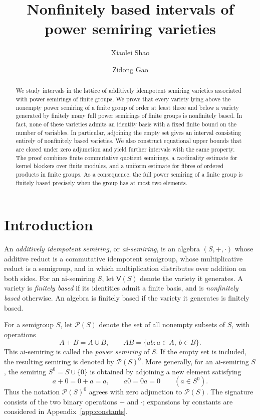 \documentclass[11pt,reqno]{amsart}
\title[Intervals of power semiring varieties]{Nonfinitely based intervals of power semiring varieties}
\author{Xiaolei Shao}
\author{Zidong Gao}
\date{}
\theoremstyle{definition}
\numberwithin{equation}{section}
\newcommand{\Pow}{\mathcal{P}}
\newcommand{\Full}[1]{\mathcal{P}(#1)^0}
\newcommand{\Var}{\mathsf{V}}
\begin{document}
\begin{abstract}
We study intervals in the lattice of additively idempotent semiring varieties associated with power semirings of finite groups. We prove that every variety lying above the nonempty power semiring of a finite group of order at least three and below a variety generated by finitely many full power semirings of finite groups is nonfinitely based. In fact, none of these varieties admits an identity basis with a fixed finite bound on the number of variables. In particular, adjoining the empty set gives an interval consisting entirely of nonfinitely based varieties. We also construct equational upper bounds that are closed under zero adjunction and yield further intervals with the same property. The proof combines finite commutative quotient semirings, a cardinality estimate for kernel blockers over finite modules, and a uniform estimate for fibres of ordered products in finite groups. As a consequence, the full power semiring of a finite group is finitely based precisely when the group has at most two elements.
\end{abstract}
\maketitle

\section{Introduction}
An \emph{additively idempotent semiring}, or \emph{ai-semiring}, is an algebra $(S,+,\cdot)$ whose additive reduct is a commutative idempotent semigroup, whose multiplicative reduct is a semigroup, and in which multiplication distributes over addition on both sides. For an ai-semiring $S$, let $\Var(S)$ denote the variety it generates. A variety is \emph{finitely based} if its identities admit a finite basis, and is \emph{nonfinitely based} otherwise. An algebra is finitely based if the variety it generates is finitely based.

For a semigroup $S$, let $\Pow(S)$ denote the set of all nonempty subsets of $S$, with operations
\[
 A+B=A\cup B,\qquad AB=\{ab:a\in A,\ b\in B\}.
\]
This ai-semiring is called the \emph{power semiring} of $S$. If the empty set is included, the resulting semiring is denoted by $\Full{S}$. More generally, for an ai-semiring $S$, the semiring $S^0=S\cup\{0\}$ is obtained by adjoining a new element satisfying
\[
 a+0=0+a=a,\qquad a0=0a=0\qquad(a\in S^0).
\]
Thus the notation $\Full{S}$ agrees with zero adjunction to $\Pow(S)$. The signature consists of the two binary operations $+$ and $\cdot$; expansions by constants are considered in Appendix~\ref{app:constants}.
\end{document}
